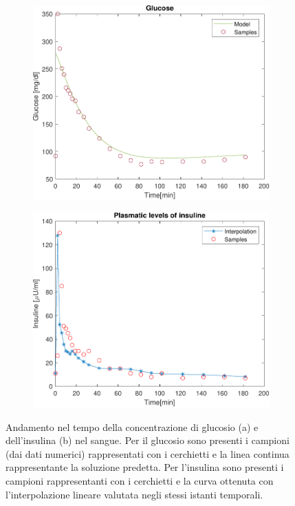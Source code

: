 \begin{figure}[t!]
	\begin{subfigure}{0.5\linewidth}
		\centering
		\includegraphics[width=0.95\linewidth]{../code/prediction/matlab/figs/glucose_model}
		\caption{}
		\label{fig:glucosemodel}
	\end{subfigure}\hfill
	\begin{subfigure}{0.5\linewidth}
		\centering
		\includegraphics[width=0.95\linewidth]{../code/prediction/matlab/figs/insuline_model}
		\caption{}
		\label{fig:insuline_model}
	\end{subfigure}\hfill
	\caption{Andamento nel tempo della concentrazione di glucosio (a) e dell'insulina (b) nel sangue. Per il glucosio sono presenti i campioni (dai dati numerici) rappresentati con i cerchietti e la linea continua rappresentante la soluzione predetta. Per l'insulina sono presenti i campioni rappresentanti con i cerchietti e la curva ottenuta con l'interpolazione lineare valutata negli stessi istanti temporali.}
\end{figure}

